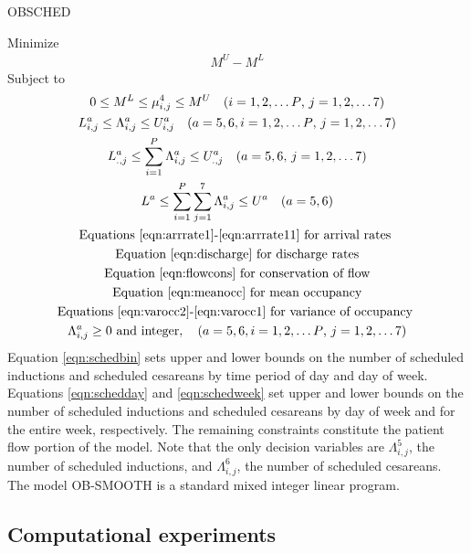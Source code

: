 \documentclass{article}
\newcommand{\nipar}{\par\noindent\ignorespaces}
\begin{document}
\newpage
\nipar {\bf Model:} OBSCHED
\nipar
\nipar Minimize
\begin{gather}
M^{U} - M^{L} \label{eqn:obj} 
\end{gather}
Subject to
\begin{gather}
0 \leq M^{L} \leq \mu_{i,j}^{4} \leq M^{U} \quad \text{($i=1,2,\ldots P$, $j=1,2,\ldots 7$)} \label{eqn:sandwich} \\ 
L_{i,j}^{a} \leq \Lambda_{i,j}^{a} \leq U_{i,j}^{a} \quad \text{($a=5,6, i=1,2,\ldots P$, $j=1,2,\ldots 7$)} \label{eqn:schedbin} \\
L_{.,j}^{a} \leq \sum_{i=1}^{P}\Lambda_{i,j}^{a} \leq U_{.,j}^{a} \quad \text{($a=5,6$, $j=1,2,\ldots 7$)} \label{eqn:schedday} \\
L^{a} \leq \sum_{i=1}^{P}\sum_{j=1}^{7}\Lambda_{i,j}^{a} \leq U^{a} \quad \text{($a=5,6$)} \label{eqn:schedweek} \\ 
\text{Equations \eqref{eqn:arrrate1}-\eqref{eqn:arrrate11} for arrival rates }  \\
\text{Equation \eqref{eqn:discharge} for discharge rates}  \\
\text{Equation \eqref{eqn:flowcons} for conservation of flow}  \\
\text{Equation \eqref{eqn:meanocc} for mean occupancy} \\
\text{Equations \eqref{eqn:varocc2}-\eqref{eqn:varocc1} for variance of occupancy }  \\
\Lambda_{i,j}^{a} \geq 0 \text{ and integer}, \quad \text{($a=5,6, i=1,2,\ldots P$, $j=1,2,\ldots 7)$} \label{eqn:schedint}
\end{gather} 
Equation \eqref{eqn:schedbin} sets upper and lower bounds on the number of scheduled inductions and scheduled cesareans by time period of day and day of week. Equations \eqref{eqn:schedday} and \eqref{eqn:schedweek} set upper and lower bounds on the number of scheduled inductions and scheduled cesareans by day of week and for the entire week, respectively. The remaining constraints constitute the patient flow portion of the model. Note that the only decision variables are $\Lambda_{i,j}^{5}$, the number of scheduled inductions, and $\Lambda_{i,j}^{6}$, the number of scheduled cesareans. The model OB-SMOOTH is a standard mixed integer linear program. 


\subsection{Computational experiments}
\label{sec-computational}
\end{document}

